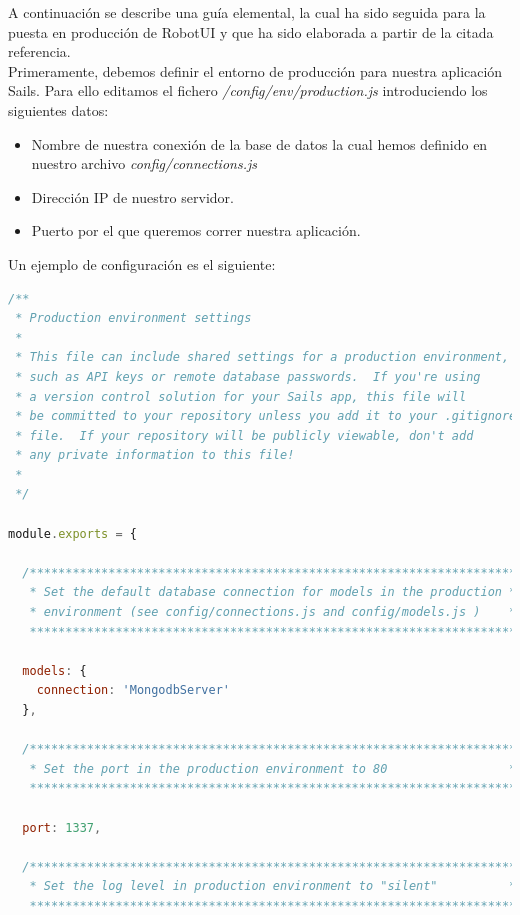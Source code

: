 \begin{appendices}
A continuación se describe una guía elemental, la cual ha sido seguida para la puesta en producción de RobotUI y que ha sido elaborada a partir de la citada referencia.\\

Primeramente, debemos definir el entorno de producción para nuestra aplicación Sails. Para ello editamos el fichero \emph{/config/env/production.js} introduciendo los siguientes datos:\\

\begin{itemize}
 \item Nombre de nuestra conexión de la base de datos la cual hemos definido en nuestro archivo \emph{config/connections.js}
 \item Dirección IP de nuestro servidor.
 \item Puerto por el que queremos correr nuestra aplicación.
\end{itemize}
  
Un ejemplo de configuración es el siguiente:

\begin{lstlisting}[language=JavaScript]
/**
 * Production environment settings
 *
 * This file can include shared settings for a production environment,
 * such as API keys or remote database passwords.  If you're using
 * a version control solution for your Sails app, this file will
 * be committed to your repository unless you add it to your .gitignore
 * file.  If your repository will be publicly viewable, don't add
 * any private information to this file!
 *
 */

module.exports = {

  /********************************************************************
   * Set the default database connection for models in the production *
   * environment (see config/connections.js and config/models.js )    *
   ********************************************************************/

  models: {
    connection: 'MongodbServer'
  },

  /********************************************************************
   * Set the port in the production environment to 80                 *
   ********************************************************************/

  port: 1337,

  /********************************************************************
   * Set the log level in production environment to "silent"          *
   ********************************************************************/


\end{lstlisting}
\end{appendices}
